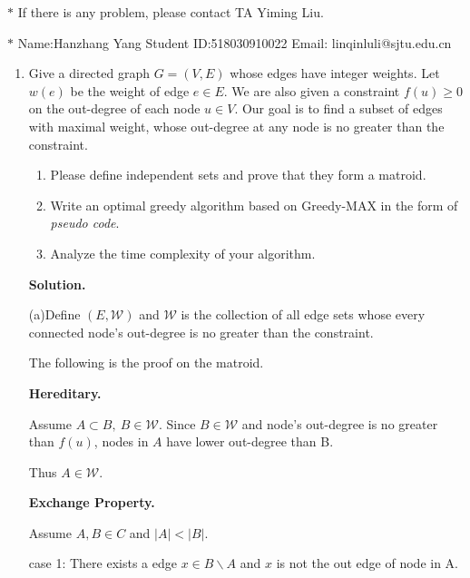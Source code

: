\documentclass[12pt,a4paper]{article}
\theoremstyle{definition}
\begin{document}
\noindent

\noindent{}
\begin{center}
\footnotesize{\color{red}$*$ If there is any problem, please contact TA Yiming Liu.}

\footnotesize{\color{blue}$*$ Name:Hanzhang Yang  \quad Student ID:518030910022 \quad Email: linqinluli@sjtu.edu.cn}
\end{center}

\begin{enumerate}
\item Give a directed graph $G=(V,E)$ whose edges have integer weights. Let $w(e)$ be the weight of edge $e\in E$. We are also given a constraint $f(u)\geq 0$ on the out-degree of each node $u\in V$. Our goal is to find a subset of edges with maximal weight, whose out-degree at any node is no greater than the constraint.
	\begin{enumerate}
	    \item Please define independent sets and prove that they form a matroid.
	    \item Write an optimal greedy algorithm based on Greedy-MAX in the form of \emph{pseudo code}.
	    \item Analyze the time complexity of your algorithm.
	\end{enumerate}

\textbf{Solution.}

(a)Define $(E,\mathcal{W})$ and $\mathcal{W}$ is the collection of all edge sets whose every connected node's out-degree is no greater than the constraint.

The following is the proof on the matroid.

\textbf{Hereditary.}

Assume $A\subset B,\ B\in \mathcal{W}$. Since $B\in\mathcal{W}$ and node's out-degree is no greater than $f(u)$, nodes in $A$ have lower out-degree than B.

Thus $A\in \mathcal{W}$.

\textbf{Exchange Property.}

Assume $A,B\in C$ and $|A|< |B|$.

case 1: There exists a edge $x\in B\backslash A$ and $x$ is not the out edge of node in A.


\end{enumerate}
\end{document}
